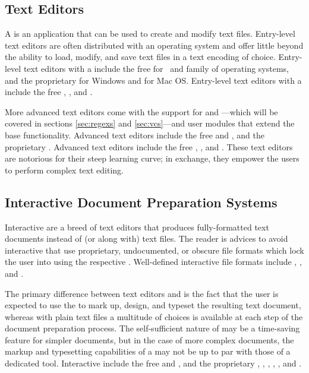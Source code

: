 \subsection{Text Editors}
A  is an application that can be used to create and modify
text files. Entry-level text editors are often distributed with an operating
system and offer little beyond the ability to load, modify, and save text files
in a text encoding of choice. Entry-level text editors with a 
include the free  for \Linux\ and  family of operating
systems, and the proprietary  for Windows and  for
Mac OS. Entry-level text editors with a  include the free
, 
, and .

More advanced text editors come with the support for 
and ---which will be covered in sections \ref{sec:regexs}
and \ref{sec:vcs}---and user modules that extend the base functionality.
Advanced  text editors include the free  and
, and the proprietary .  Advanced  text
editors include the free , , and . These
 text editors are notorious for their steep learning curve; in
exchange, they empower the users to perform complex text editing.

\subsection{Interactive Document Preparation Systems}
Interactive  are a breed of text
editors that produces fully-formatted text documents instead of (or along with)
text files. The reader is advices to avoid interactive  that use
proprietary, undocumented, or obscure file formats which lock the user into
using the respective . Well-defined interactive  file
formats include , , and .

The primary difference between text editors and  is the fact that
the user is expected to use the  to mark up, design, and typeset the
resulting text document, whereas with plain text files a multitude of choices is
available at each step of the document preparation process. The self-sufficient
nature of  may be a time-saving feature for simpler documents, but
in the case of more complex documents, the markup and typesetting capabilities
of a  may not be up to par with those of a dedicated tool.
Interactive  include the free  and
, and the proprietary , ,
, , , and
.

